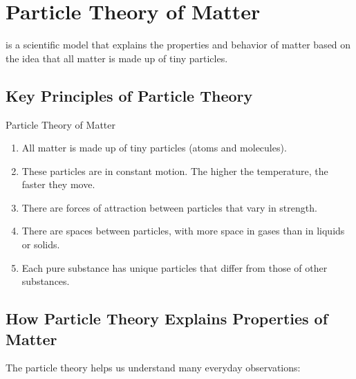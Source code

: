 
\section{Particle Theory of Matter}

 is a scientific model that explains the properties and behavior of matter based on the idea that all matter is made up of tiny particles.

\subsection{Key Principles of Particle Theory}

\begin{keyconcept}{Particle Theory of Matter}
\begin{enumerate}
    \item All matter is made up of tiny particles (atoms and molecules).
    
    \item These particles are in constant motion. The higher the temperature, the faster they move.
    
    \item There are forces of attraction between particles that vary in strength.
    
    \item There are spaces between particles, with more space in gases than in liquids or solids.
    
    \item Each pure substance has unique particles that differ from those of other substances.
\end{enumerate}
\end{keyconcept}


\subsection{How Particle Theory Explains Properties of Matter}

The particle theory helps us understand many everyday observations:

